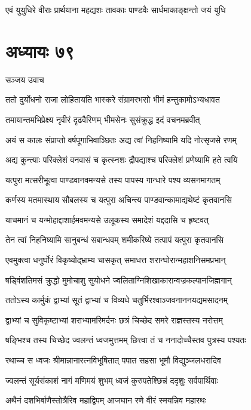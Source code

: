 \twolineshloka
{एवं युयुधिरे वीराः प्रार्थयाना महद्यशः}
{तावकाः पाण्डवैः सार्धमाकाङ्क्षन्तो जयं युधि}


\chapter{अध्यायः ७९}
\twolineshloka
{सञ्जय उवाच}
{}


\twolineshloka
{ततो दुर्योधनो राजा लोहितायति भास्करे}
{संग्रामरभसो भीमं हन्तुकामोऽभ्यधावत}


\twolineshloka
{तमायान्तमभिप्रेक्ष्य नृवीरं दृढवैरिणम्}
{भीमसेनः सुसंक्रुद्ध इदं वचनमब्रवीत्}


\twolineshloka
{अयं स कालः संप्राप्तो वर्षपूगाभिवाञ्छितः}
{अद्य त्वां निहनिष्यामि यदि नोत्सृजसे रणम्}


\twolineshloka
{अद्य कुन्त्याः परिक्लेशं वनवासं च कृत्स्नशः}
{द्रौपद्याश्च परिक्लेशं प्रणेष्यामि हते त्वयि}


\twolineshloka
{यत्पुरा मत्सरीभूत्वा पाण्डवानवमन्यसे}
{तस्य पापस्य गान्धारे पश्य व्यसनमागतम्}


\twolineshloka
{कर्णस्य मतमास्थाय सौबलस्य च यत्पुरा}
{अचिन्त्य पाण्डवान्कामाद्यथेष्टं कृतवानसि}


\twolineshloka
{याचमानं च यन्मोहाद्दाशार्हमवमन्यसे}
{उलूकस्य समादेशं यद्ददासि च हृष्टवत्}


\twolineshloka
{तेन त्वां निहनिष्यामि सानुबन्धं सबान्धवम्}
{शमीकरिष्ये तत्पापं यत्पुरा कृतवानसि}


\twolineshloka
{एवमुक्त्वा धनुर्घोरं विकृष्योद्भ्राम्य चासकृत्}
{समाधत्त शरान्घोरान्महाशनिसमप्रभान्}


\twolineshloka
{षड्विंशतिमसं क्रुद्धो मुमोचाशु सुयोधने}
{ज्वलिताग्निशिखाकारान्वज्रकल्पानजिह्मगान्}


\twolineshloka
{ततोऽस्य कार्मुकं द्वाभ्यां सूतं द्वाभ्यां च विव्यधे}
{चतुर्भिरश्वाञ्जवनाननयद्यमसादनम्}


\twolineshloka
{द्वाभ्यां च सुविकृष्टाभ्यां शराभ्यामरिमर्दनः}
{छत्रं चिच्छेद समरे राज्ञस्तस्य नरोत्तम्}


\twolineshloka
{षङ्भिश्च तस्य चिच्छेद ज्वलन्तं ध्वजमुत्तमम्}
{छित्त्वा तं च ननादोच्चैस्तव पुत्रस्य पश्यतः}


\twolineshloka
{रथाच्च स ध्वजः श्रीमान्नानारत्नविभूषितात्}
{पपात सहसा भूमौ विद्युञ्जलधरादिव}


\twolineshloka
{ज्वलन्तं सूर्यसंकाशं नागं मणिमयं शुभम्}
{ध्वजं कुरुपतेश्छिन्नं ददृशुः सर्वपार्थिवाः}


\twolineshloka
{अथैनं दशभिर्बाणैस्तोत्रैरिव महाद्विपम्}
{आजघान रणे वीरं स्मयन्निव महारथः}



